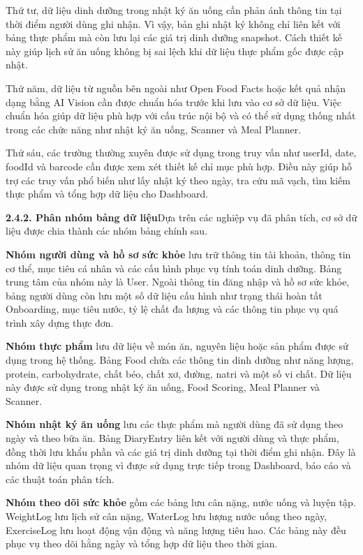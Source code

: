 Thứ tư, dữ liệu dinh dưỡng trong nhật ký ăn uống cần phản ánh thông tin tại thời điểm người dùng ghi nhận. Vì vậy, bản ghi nhật ký không chỉ liên kết với bảng thực phẩm mà còn lưu lại các giá trị dinh dưỡng snapshot. Cách thiết kế này giúp lịch sử ăn uống không bị sai lệch khi dữ liệu thực phẩm gốc được cập nhật.

Thứ năm, dữ liệu từ nguồn bên ngoài như Open Food Facts hoặc kết quả nhận dạng bằng AI Vision cần được chuẩn hóa trước khi lưu vào cơ sở dữ liệu. Việc chuẩn hóa giúp dữ liệu phù hợp với cấu trúc nội bộ và có thể sử dụng thống nhất trong các chức năng như nhật ký ăn uống, Scanner và Meal Planner.

Thứ sáu, các trường thường xuyên được sử dụng trong truy vấn như userId, date, foodId và barcode cần được xem xét thiết kế chỉ mục phù hợp. Điều này giúp hỗ trợ các truy vấn phổ biến như lấy nhật ký theo ngày, tra cứu mã vạch, tìm kiếm thực phẩm và tổng hợp dữ liệu cho Dashboard.

\textbf{2.4.2. Phân nhóm bảng dữ liệu}Dựa trên các nghiệp vụ đã phân tích, cơ sở dữ liệu được chia thành các nhóm bảng chính sau.

\textbf{Nhóm người dùng và hồ sơ sức khỏe} lưu trữ thông tin tài khoản, thông tin cơ thể, mục tiêu cá nhân và các cấu hình phục vụ tính toán dinh dưỡng. Bảng trung tâm của nhóm này là User. Ngoài thông tin đăng nhập và hồ sơ sức khỏe, bảng người dùng còn lưu một số dữ liệu cấu hình như trạng thái hoàn tất Onboarding, mục tiêu nước, tỷ lệ chất đa lượng và các thông tin phục vụ quá trình xây dựng thực đơn.

\textbf{Nhóm thực phẩm} lưu dữ liệu về món ăn, nguyên liệu hoặc sản phẩm được sử dụng trong hệ thống. Bảng Food chứa các thông tin dinh dưỡng như năng lượng, protein, carbohydrate, chất béo, chất xơ, đường, natri và một số vi chất. Dữ liệu này được sử dụng trong nhật ký ăn uống, Food Scoring, Meal Planner và Scanner.

\textbf{Nhóm nhật ký ăn uống} lưu các thực phẩm mà người dùng đã sử dụng theo ngày và theo bữa ăn. Bảng DiaryEntry liên kết với người dùng và thực phẩm, đồng thời lưu khẩu phần và các giá trị dinh dưỡng tại thời điểm ghi nhận. Đây là nhóm dữ liệu quan trọng vì được sử dụng trực tiếp trong Dashboard, báo cáo và các thuật toán phân tích.

\textbf{Nhóm theo dõi sức khỏe} gồm các bảng lưu cân nặng, nước uống và luyện tập. WeightLog lưu lịch sử cân nặng, WaterLog lưu lượng nước uống theo ngày, ExerciseLog lưu hoạt động vận động và năng lượng tiêu hao. Các bảng này đều phục vụ theo dõi hằng ngày và tổng hợp dữ liệu theo thời gian.


